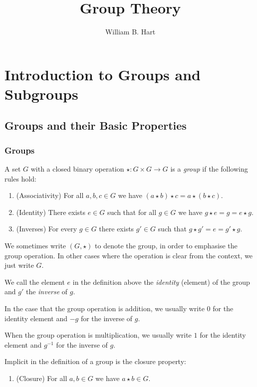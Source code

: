 \documentclass[10pt]{article}
\title{Group Theory}
\author{William B. Hart}
\newenvironment{definition}[1][Definition]{\begin{trivlist}
\item[\hskip \labelsep {\bfseries #1}]}{\end{trivlist}}
\begin{document}
\maketitle

\tableofcontents

\section{Introduction to Groups and Subgroups}

\subsection{Groups and their Basic Properties}

\subsubsection{Groups}

\begin{definition}
A set $G$ with a closed binary operation $\star : G \times G \to G$ is a \emph{group} if the following rules hold:
\begin{enumerate}
\item (Associativity) For all $a, b, c \in G$ we have $(a \star b) \star c = a \star (b \star c)$.
\item (Identity) There exists $e \in G$ such that for all $g \in G$ we have $g\star e = g = e \star g$.
\item (Inverses) For every $g \in G$ there exists $g' \in G$ such that $g \star g' = e = g' \star g$.
\end{enumerate}
We sometimes write $(G, \star)$ to denote the group, in order to emphasise the group operation. In other cases where the operation is clear from the context, we just write $G$.
\end{definition}

We call the element $e$ in the definition above the \emph{identity} (element) of the group and $g'$ the \emph{inverse} of $g$.

In the case that the group operation is addition, we usually write $0$ for the identity element and $-g$ for the inverse of $g$.

When the group operation is multiplication, we usually write $1$ for the identity element and $g^{-1}$ for the inverse of $g$.

Implicit in the definition of a group is the closure property:

\begin{enumerate}
\item (Closure) For all $a, b \in G$ we have $a\star b \in G$.
\end{enumerate}
\end{document}
